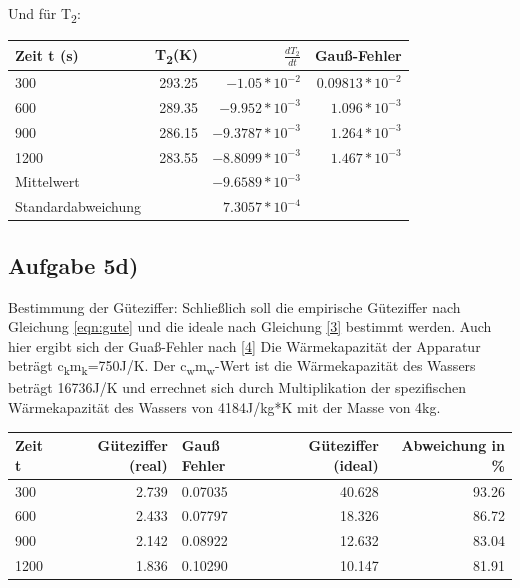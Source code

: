 \documentclass[titlepage=firstcover, captions=tableheading]{scrartcl}
\begin{document}
    Und  für T\textsubscript{2}:
    \begin{center}
        \begin{tabular}{
            l
            r
            r
            r
        }
            \toprule
            {Zeit t (s)} & {T\textsubscript{2}(K)} & {$\frac{dT_2}{dt} $} & {Gauß-Fehler} \\
            \midrule
            300 & 293.25 & $-1.05*10^{-2}$ & $0.09813 * 10^{-2}$\\
            600 & 289.35 & $-9.952*10^{-3}$ & $1.096 * 10^{-3}$\\
            900 & 286.15 & $-9.3787*10^{-3}$ & $1.264 * 10^{-3}$\\
            1200 & 283.55 & $-8.8099*10^{-3}$ & $1.467 * 10^{-3}$\\
            \midrule
            Mittelwert & & $-9.6589*10^{-3}$ & \\
            Standardabweichung & & $7.3057*10^{-4}$ & \\
            \bottomrule
        \end{tabular}
        \end{center}
        \subsection{Aufgabe 5d)}
        Bestimmung der Güteziffer: Schließlich soll die empirische Güteziffer nach Gleichung \eqref{eqn:gute} und die ideale nach Gleichung \eqref{3} bestimmt werden.
        Auch hier ergibt sich der Guaß-Fehler nach \eqref{4} 
        Die Wärmekapazität der Apparatur beträgt 
        c\textsubscript{k}m\textsubscript{k}=750J/K. 
        Der c\textsubscript{w}m\textsubscript{w}-Wert ist die Wärmekapazität des Wassers beträgt 16736J/K und 
        errechnet sich durch Multiplikation der spezifischen Wärmekapazität des Wassers 
        von 4184J/kg*K mit der Masse von 4kg. 

        \begin{center}
            \begin{tabular}{lr@{${}\pm{}$}lrr}
                \toprule
                {Zeit t} & { Güteziffer (real)} & {Gauß Fehler} & {Güteziffer (ideal)} & {Abweichung in \%} \\
                \midrule
                300 & 2.739 & 0.07035  & 40.628 & 93.26 \\
                600 & 2.433 & 0.07797  & 18.326 & 86.72 \\
                900 & 2.142 & 0.08922 & 12.632 & 83.04 \\
                1200 & 1.836 & 0.10290 & 10.147 & 81.91\\
                \bottomrule
                
            \end{tabular}
        \end{center}
\end{document}
